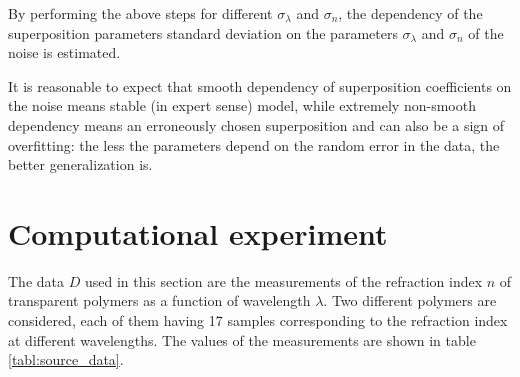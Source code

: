 \documentclass[11pt,a4paper]{article}
\theoremstyle{definition}
\begin{document}
By performing the above steps for different $\sigma_{\lambda}$ and $\sigma_n$,
the dependency of the superposition parameters standard deviation on the
parameters $\sigma_{\lambda}$ and $\sigma_n$ of the noise is estimated.

It is reasonable to expect that smooth dependency of superposition coefficients
on the noise means stable (in expert sense) model, while extremely
non-smooth dependency means an erroneously chosen superposition and can also be
a sign of overfitting: the less the parameters depend on the random error
in the data, the better generalization is.

\section{Computational experiment}

The data $D$ used in this section are the measurements of the refraction index $n$
of transparent polymers as a function of wavelength $\lambda$. Two different polymers
are considered, each of them having 17 samples corresponding to the
refraction index at different wavelengths. The values of the measurements
are shown in table \ref{tabl:source_data}.

\end{document}

